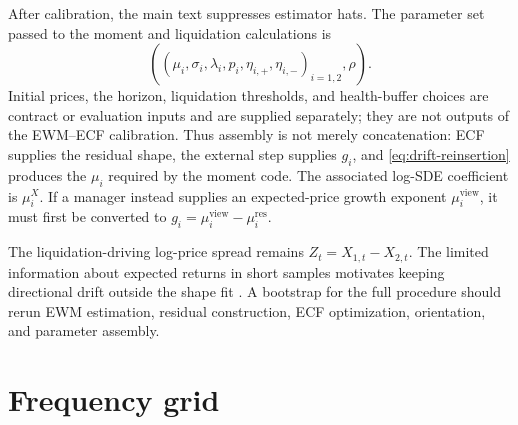 \documentclass[11pt]{article}
\begin{document}
After calibration, the main text suppresses estimator hats. The parameter set passed to the
moment and liquidation calculations is
\begin{equation}\label{eq:empirical-parameter-set}
\left((\mu_i,\sigma_i,\lambda_i,p_i,\eta_{i,+},\eta_{i,-})_{i=1,2},\rho\right).
\end{equation}
Initial prices, the horizon, liquidation thresholds, and health-buffer choices are contract
or evaluation inputs and are supplied separately; they are not outputs of the EWM--ECF
calibration.
Thus assembly is not merely concatenation: ECF supplies the residual shape, the external
step supplies $g_i$, and \eqref{eq:drift-reinsertion} produces the $\mu_i$ required by the
moment code. The associated log-SDE coefficient is $\mu_i^X$. If a manager instead supplies
an expected-price growth exponent $\mu_i^{\mathrm{view}}$, it must first be converted to
$g_i=\mu_i^{\mathrm{view}}-\mu_i^{\mathrm{res}}$.

The liquidation-driving log-price spread remains $Z_t=X_{1,t}-X_{2,t}$. The limited
information about expected returns in short samples motivates keeping directional drift
outside the shape fit \citep{Merton1980}. A bootstrap for the full procedure should rerun
EWM estimation, residual construction, ECF optimization, orientation, and parameter
assembly.

\section{Frequency grid}\label{sec:ecf-grid}
\end{document}

